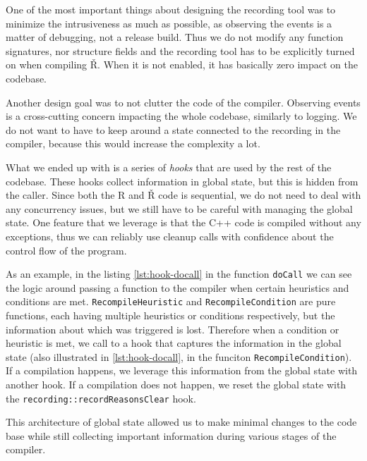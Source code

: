 One of the most important things about designing the recording tool was to minimize the intrusiveness as much as possible, as observing the events is a matter of debugging, not a release build. Thus we do not modify any function signatures, nor structure fields and the recording tool has to be explicitly turned on when compiling Ř. When it is not enabled, it has basically zero impact on the codebase.

Another design goal was to not clutter the code of the compiler. Observing events is a cross-cutting concern impacting the whole codebase, similarly to logging. We do not want to have to keep around a state connected to the recording in the compiler, because this would increase the complexity a lot.

What we ended up with is a series of \textit{hooks} that are used by the rest of the codebase. These hooks collect information in global state, but this is hidden from the caller. Since both the R and Ř code is sequential, we do not need to deal with any concurrency issues, but we still have to be careful with managing the global state. One feature that we leverage is that the C++ code is compiled without any exceptions, thus we can reliably use cleanup calls with confidence about the control flow of the program.

As an example, in the listing \ref{lst:hook-docall} in the function \texttt{doCall} we can see the logic around passing a function to the compiler when certain heuristics and conditions are met. \texttt{RecompileHeuristic} and \texttt{RecompileCondition} are pure functions, each having multiple heuristics or conditions respectively, but the information about which was triggered is lost. Therefore when a condition or heuristic is met, we call to a hook that captures the information in the global state (also illustrated in \ref{lst:hook-docall}, in the funciton \texttt{RecompileCondition}). If a compilation happens, we leverage this information from the global state with another hook. If a compilation does not happen, we reset the global state with the \texttt{recording::recordReasonsClear} hook.

This architecture of global state allowed us to make minimal changes to the code base while still collecting important information during various stages of the compiler.

